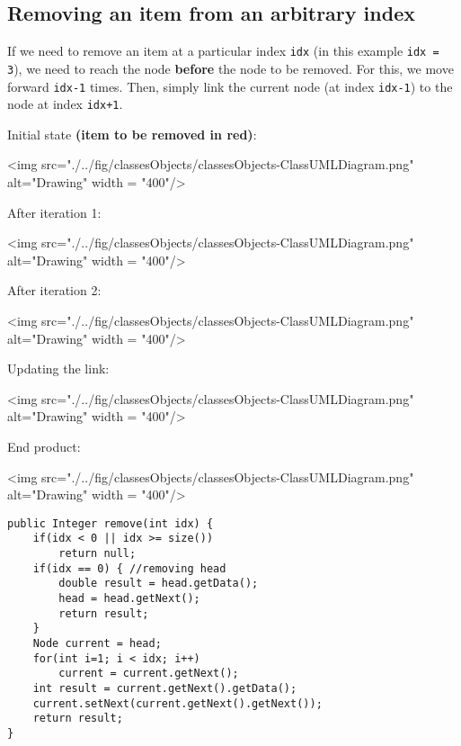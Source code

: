 \subsection{Removing an item from an arbitrary index}

If we need to remove an item at a particular index \texttt{idx} (in this example \texttt{idx = 3}), we need to reach the node \textbf{before} the node to be removed. For this, we move forward \texttt{idx-1} times. Then, simply link the current node (at index \texttt{idx-1}) to the node at index \texttt{idx+1}.

Initial state \textbf{(item to be removed in red)}:
\vskip 0.2cm

<img src="./../fig/classesObjects/classesObjects-ClassUMLDiagram.png" alt="Drawing" width = "400"/>
\vskip 0.2cm

After iteration 1:
\vskip 0.2cm

<img src="./../fig/classesObjects/classesObjects-ClassUMLDiagram.png" alt="Drawing" width = "400"/>
\vskip 0.2cm

After iteration 2:
\vskip 0.2cm

<img src="./../fig/classesObjects/classesObjects-ClassUMLDiagram.png" alt="Drawing" width = "400"/>
\vskip 0.2cm

Updating the link:

<img src="./../fig/classesObjects/classesObjects-ClassUMLDiagram.png" alt="Drawing" width = "400"/>
\vskip 0.2cm

End product:
\vskip 0.2cm

<img src="./../fig/classesObjects/classesObjects-ClassUMLDiagram.png" alt="Drawing" width = "400"/>


\newpage

\begin{lstlisting}
public Integer remove(int idx) {
	if(idx < 0 || idx >= size()) 
		return null;
	if(idx == 0) { //removing head
		double result = head.getData();
		head = head.getNext();
		return result;
	}
	Node current = head;
	for(int i=1; i < idx; i++)
		current = current.getNext();
	int result = current.getNext().getData();
	current.setNext(current.getNext().getNext());
	return result;
}
\end{lstlisting}


